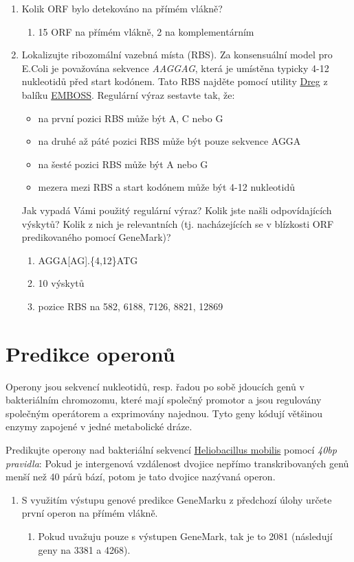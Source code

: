 \documentclass[11pt]{article}
\begin{document}
\begin{enumerate}
\item Kolik ORF bylo detekováno na přímém vlákně?
\begin{enumerate}
\item 15 ORF na přímém vlákně, 2 na komplementárním
\end{enumerate}
\item Lokalizujte ribozomální vazebná místa (RBS). Za konsensuální model pro E.Coli
je považována sekvence \emph{AAGGAG}, která je umístěna typicky 4-12 nukleotidů před
start kodónem. Tato RBS najděte pomocí utility \href{http://emboss.bioinformatics.nl/cgi-bin/emboss/dreg}{Dreg} z balíku
\href{http://emboss.bioinformatics.nl}{EMBOSS}. Regulární výraz sestavte tak, že:

\begin{itemize}
\item na první pozici RBS může být A, C nebo G
\item na druhé až páté pozici RBS může být pouze sekvence AGGA
\item na šesté pozici RBS může být A nebo G
\item mezera mezi RBS a start kodónem může být 4-12 nukleotidů
\end{itemize}

Jak vypadá Vámi použitý regulární výraz? Kolik jste našli odpovídajících
výskytů? Kolik z nich je relevantních (tj.  nacházejících se v blízkosti ORF
predikovaného pomocí GeneMark)?
\begin{enumerate}
\item\relax [ACG]AGGA[AG].\{4,12\}ATG
\item 10 výskytů
\item pozice RBS na 582, 6188, 7126, 8821, 12869
\end{enumerate}
\end{enumerate}

\section{Predikce operonů}
\label{sec:org9585023}
Operony jsou sekvencí nukleotidů, resp. řadou po sobě jdoucích genů v
bakteriálním chromozomu, které mají společný promotor a jsou regulovány
společným operátorem a exprimovány najednou. Tyto geny kódují většinou enzymy
zapojené v jedné metabolické dráze.

Predikujte operony nad bakteriální sekvencí \href{./heliobacillus\_mobilis.txt}{Heliobacillus mobilis} pomocí \emph{40bp
pravidla}: Pokud je intergenová vzdálenost dvojice nepřímo transkribovaných genů
menší než 40 párů bází, potom je tato dvojice nazývaná operon.

\begin{enumerate}
\item S využitím výstupu genové predikce GeneMarku z předchozí úlohy určete první
operon na přímém vlákně.
\begin{enumerate}
\item Pokud uvažuju pouze s výstupen GeneMark, tak je to 2081 (následují geny na
3381 a 4268).
\end{enumerate}
\end{enumerate}
\end{document}
